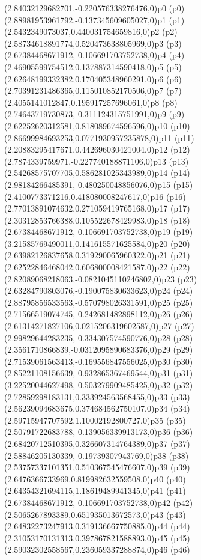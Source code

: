 \psPoint(2.84032129682701,-0.220576338276476,0){p0}
\psdot(p0)
\psPoint(2.88981953961792,-0.137345609605027,0){p1}
\psdot(p1)
\psPoint(2.5432349073037,0.440031754659816,0){p2}
\psdot(p2)
\psPoint(2.58734618891774,0.520473638805969,0){p3}
\psdot(p3)
\psPoint(2.67384468671912,-0.106691703752738,0){p4}
\psdot(p4)
\psPoint(2.46905599754512,0.137887314590418,0){p5}
\psdot(p5)
\psPoint(2.62648199332382,0.170405348960291,0){p6}
\psdot(p6)
\psPoint(2.70391231486365,0.115010852170506,0){p7}
\psdot(p7)
\psPoint(2.4055141012847,0.195917257696061,0){p8}
\psdot(p8)
\psPoint(2.74643719730873,-0.311124315751991,0){p9}
\psdot(p9)
\psPoint(2.62252620312581,0.818089674596596,0){p10}
\psdot(p10)
\psPoint(2.86699984693253,0.0771930957235878,0){p11}
\psdot(p11)
\psPoint(2.20883295417671,0.442696030421004,0){p12}
\psdot(p12)
\psPoint(2.7874339759971,-0.227740188871106,0){p13}
\psdot(p13)
\psPoint(2.54268575707705,0.586281025343989,0){p14}
\psdot(p14)
\psPoint(2.98184266485391,-0.480250048856076,0){p15}
\psdot(p15)
\psPoint(2.4100773371216,0.418080008247617,0){p16}
\psdot(p16)
\psPoint(2.77013891074632,0.271059419765168,0){p17}
\psdot(p17)
\psPoint(2.30312853766388,0.105522678429983,0){p18}
\psdot(p18)
\psPoint(2.67384468671912,-0.106691703752738,0){p19}
\psdot(p19)
\psPoint(3.21585769490011,0.141615571625584,0){p20}
\psdot(p20)
\psPoint(2.63982126837658,0.319290065960322,0){p21}
\psdot(p21)
\psPoint(2.62522846468042,0.606800008421587,0){p22}
\psdot(p22)
\psPoint(2.82089068218063,-0.0821045110246802,0){p23}
\psdot(p23)
\psPoint(2.63284790803076,-0.190075830633623,0){p24}
\psdot(p24)
\psPoint(2.88795856533563,-0.570798026331591,0){p25}
\psdot(p25)
\psPoint(2.71566519074745,-0.242681482898112,0){p26}
\psdot(p26)
\psPoint(2.61314271827106,0.0215206319602587,0){p27}
\psdot(p27)
\psPoint(2.99829644283235,-0.334307574590776,0){p28}
\psdot(p28)
\psPoint(2.3561710866839,-0.0312095890683376,0){p29}
\psdot(p29)
\psPoint(2.71539061563413,-0.169556847556025,0){p30}
\psdot(p30)
\psPoint(2.85221108156639,-0.932865367469544,0){p31}
\psdot(p31)
\psPoint(3.22520044627498,-0.503279909485425,0){p32}
\psdot(p32)
\psPoint(2.72859298183131,0.333924563568455,0){p33}
\psdot(p33)
\psPoint(2.56239094683675,0.374684562750107,0){p34}
\psdot(p34)
\psPoint(2.59715947707592,1.10002192800727,0){p35}
\psdot(p35)
\psPoint(2.50791722683788,-0.139056339913173,0){p36}
\psdot(p36)
\psPoint(2.68420712510395,0.326607314764389,0){p37}
\psdot(p37)
\psPoint(2.58846205130339,-0.19739307943769,0){p38}
\psdot(p38)
\psPoint(2.53757337101351,0.510367545476607,0){p39}
\psdot(p39)
\psPoint(2.6476366733969,0.819982632559508,0){p40}
\psdot(p40)
\psPoint(2.64354321694115,1.18619489941345,0){p41}
\psdot(p41)
\psPoint(2.67384468671912,-0.106691703752738,0){p42}
\psdot(p42)
\psPoint(2.5065267893389,0.651935013672573,0){p43}
\psdot(p43)
\psPoint(2.64832273247913,0.319136667750885,0){p44}
\psdot(p44)
\psPoint(2.31053170131313,0.397867821588893,0){p45}
\psdot(p45)
\psPoint(2.59032302558567,0.236059337288874,0){p46}
\psdot(p46)
